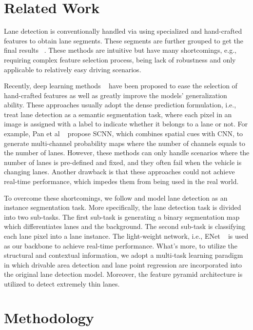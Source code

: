 \documentclass[draftcls]{IEEEtran}
\begin{document}
\section{Related Work}

Lane detection is conventionally handled via using specialized and hand-crafted features to obtain lane segments. These segments are further grouped to get the final results ~\cite{borkar2012novel, deusch2012random}. These methods are intuitive but have many shortcomings, e.g., requiring complex feature selection process, being lack of robustness and only applicable to relatively easy driving scenarios. 

Recently, deep learning methods ~\cite{lee2017vpgnet, pan2017spatial, ghafoorian2018gan, chen2017rbnet} have been proposed to ease the selection of hand-crafted features as well as greatly improve the models' generalization ability. These approaches usually adopt the dense prediction formulation, i.e., treat lane detection as a semantic segmentation task, where each pixel in an image is assigned with a label to indicate whether it belongs to a lane or not. For example, Pan et al ~\cite{pan2017spatial} propose SCNN, which combines spatial cues with CNN, to generate multi-channel probability maps where the number of channels equals to the number of lanes. However, these methods can only handle scenarios where the number of lanes is pre-defined and fixed, and they often fail when the vehicle is changing lanes. Another drawback is that these approaches could not achieve real-time performance, which impedes them from being used in the real world. 

To overcome these shortcomings, we follow \cite{neven2018towards} and model lane detection as an instance segmentation task. More specifically, the lane detection task is divided into two sub-tasks. The first sub-task is generating a binary segmentation map which differentiates lanes and the background. The second sub-task is classifying each lane pixel into a lane instance. The light-weight network, i.e., ENet ~\cite{paszke2016enet} is used as our backbone to achieve real-time performance. What's more, to utilize the structural and contextual information, we adopt a multi-task learning paradigm in which drivable area detection and lane point regression are incorporated into the original lane detection model. Moreover, the feature pyramid architecture is utilized to detect extremely thin lanes.             


\section{Methodology}
\end{document}
